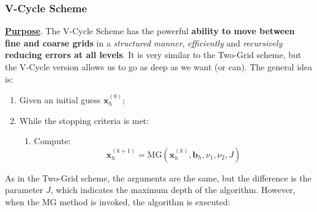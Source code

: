 \subsubsection{V-Cycle Scheme}\label{subsubsection: V-Cycle Scheme}

\textbf{\underline{Purpose}}. The V-Cycle Scheme has the powerful \textbf{ability to move between fine and coarse grids} in a \emph{structured manner}, \emph{efficiently} and \emph{recursively} \textbf{reducing errors at all levels}. It is very similar to the Two-Grid scheme, but the V-Cycle version allows us to go as deep as we want (or can). The general idea is:
\begin{enumerate}
    \item Given an initial guess $\mathbf{x}_{h}^{\left(0\right)}$;
    \item While the stopping criteria is met:
        \begin{enumerate}
            \item Compute:
            \begin{equation}
                \mathbf{x}_{h}^{\left(k+1\right)} = \mathrm{MG}\left(\mathbf{x}_{h}^{\left(k\right)}, \mathbf{b}_{h}, \nu_{1}, \nu_{2}, J\right)
            \end{equation}
        \end{enumerate} 
\end{enumerate}
As in the Two-Grid scheme, the arguments are the same, but the difference is the parameter $J$, which indicates the maximum depth of the algorithm. However, when the $\mathrm{MG}$ method is invoked, the algorithm is executed:
